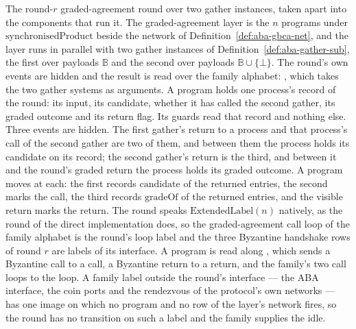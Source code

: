 \begin{definition}
  \label{def:aba-round-sub}
  \leanok
  The round-$r$ graded-agreement round over two gather instances, taken apart into the components that run it.
  The graded-agreement layer is the $n$ programs under $\mathrm{synchronisedProduct}$ beside the network of Definition~\ref{def:aba-gbca-net}, and the layer runs in parallel with two gather instances of Definition~\ref{def:aba-gather-sub}, the first over payloads $\mathbb{B}$ and the second over payloads $\mathbb{B} \cup \{\bot\}$.
  The round's own events are hidden and the result is read over the family alphabet: , which takes the two gather systems as arguments.
  A program holds one process's record of the round: its input, its candidate, whether it has called the second gather, its graded outcome and its return flag.
  Its guards read that record and nothing else.
  Three events are hidden.
  The first gather's return to a process and that process's call of the second gather are two of them, and between them the process holds its candidate on its record; the second gather's return is the third, and between it and the round's graded return the process holds its graded outcome.
  A program moves at each: the first records $\mathrm{candidate}$ of the returned entries, the second marks the call, the third records $\mathrm{gradeOf}$ of the returned entries, and the visible return marks the return.
  The round speaks $\mathrm{ExtendedLabel}(n)$ natively, as the round of the direct implementation does, so the graded-agreement call loop of the family alphabet is the round's loop label and the three Byzantine handshake rows of round $r$ are labels of its interface.
  A program is read along , which sends a Byzantine call to a call, a Byzantine return to a return, and the family's two call loops to the loop.
  A family label outside the round's interface --- the ABA interface, the coin ports and the rendezvous of the protocol's own networks --- has one image on which no program and no row of the layer's network fires, so the round has no transition on such a label and the family supplies the idle.

\end{definition}
